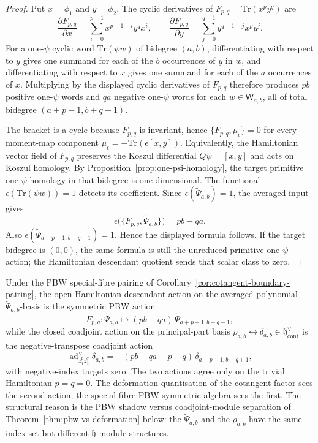 \documentclass[11pt]{memoir}
\begin{document}
\begin{proof}
  Put $x=\phi_1$ and $y=\phi_2$. The cyclic derivatives of
  $F_{p,q}=\mathrm{Tr}(x^p y^q)$ are
  $$\frac{\partial F_{p,q}}{\partial x}
    =\sum_{i=0}^{p-1}x^{p-1-i}y^qx^i,\qquad
    \frac{\partial F_{p,q}}{\partial y}
    =\sum_{j=0}^{q-1}y^{q-1-j}x^py^j.$$
  For a one-$\psi$ cyclic word $\mathrm{Tr}(\psi w)$ of bidegree $(a,b)$,
  differentiating with respect to $y$ gives one summand for each of the $b$
  occurrences of $y$ in $w$, and differentiating with respect to $x$ gives one
  summand for each of the $a$ occurrences of $x$. Multiplying by the displayed
  cyclic derivatives of $F_{p,q}$ therefore produces $pb$ positive one-$\psi$
  words and $qa$ negative one-$\psi$ words for each $w\in\mathsf W_{a,b}$, all
  of total bidegree $(a+p-1,b+q-1)$.

  The bracket is a cycle because $F_{p,q}$ is invariant, hence
  $\{F_{p,q},\mu_\epsilon\}=0$ for every moment-map component
  $\mu_\epsilon=-\mathrm{Tr}(\epsilon[x,y])$. Equivalently, the Hamiltonian
  vector field of $F_{p,q}$ preserves the Koszul differential
  $Q\psi=[x,y]$ and acts on Koszul homology. By
  Proposition~\ref{prop:one-psi-homology}, the target primitive one-$\psi$
  homology in that bidegree is one-dimensional. The functional
  $\epsilon(\mathrm{Tr}(\psi w))=1$ detects its coefficient. Since
  $\epsilon(\widetilde\Psi_{a,b})=1$, the averaged input gives
  $$\epsilon\bigl(\{F_{p,q},\widetilde\Psi_{a,b}\}\bigr)=pb-qa.$$
  Also $\epsilon(\widetilde\Psi_{a+p-1,b+q-1})=1$. Hence the displayed formula
  follows. If the target bidegree is $(0,0)$, the same formula is still the
  unreduced primitive one-$\psi$ action; the Hamiltonian descendant quotient
  sends that scalar class to zero.
\end{proof}

\begin{cor}\label{cor:descendant-coadjoint-difference}
  Under the PBW special-fibre pairing of
  Corollary~\ref{cor:cotangent-boundary-pairing}, the open Hamiltonian
  descendant action on the averaged polynomial
  \(\widetilde\Psi_{a,b}\)-basis is the symmetric PBW action
  $$F_{p,q}:\widetilde\Psi_{a,b}\longmapsto
    (pb-qa)\,\widetilde\Psi_{a+p-1,b+q-1},$$
  while the closed coadjoint action on the principal-part basis
  $\rho_{a,b}\leftrightarrow\delta_{a,b}\in\mathfrak h^\vee_{\mathrm{cont}}$
  is the negative-transpose coadjoint action
  $$\operatorname{ad}^{\vee}_{z_1^pz_2^q}\delta_{a,b}
    =-(pb-qa+p-q)\,\delta_{a-p+1,b-q+1},$$
  with negative-index targets zero. The two actions agree only on the
  trivial Hamiltonian $p=q=0$. The deformation quantisation of the
  cotangent factor sees the second action; the special-fibre PBW
  symmetric algebra sees the first. The structural reason is the PBW
  shadow versus coadjoint-module separation of
  Theorem~\ref{thm:pbw-vs-deformation} below: the
  $\widetilde\Psi_{a,b}$ and the $\rho_{a,b}$ have the same index set
  but different $\mathfrak h$-module structures.
\end{cor}
\end{document}
